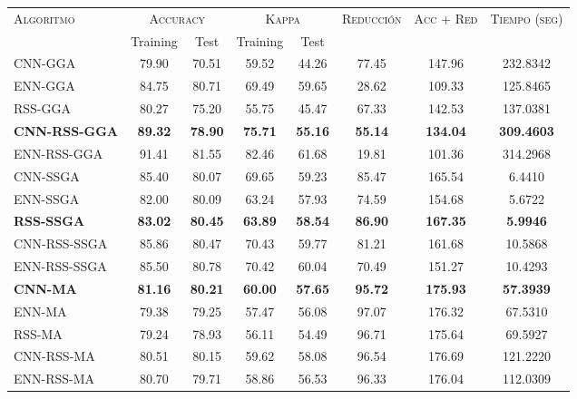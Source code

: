 \begin{table}[h!]
\centering
\begin{adjustbox}{max width =\textwidth}
\begin{tabular}{l c c c c c c c}
\hline
\multirow{2}{*}{\textsc{Algoritmo}}
	& \multicolumn{2}{c}{\textsc{Accuracy}}
	& \multicolumn{2}{c}{\textsc{Kappa}}
	& \textsc{Reducción}
	& \textsc{Acc + Red}
	& \textsc{Tiempo (seg)} \\
	& Training & Test
	& Training & Test \\ 
\hline
\hline

CNN-GGA     & 79.90 & 70.51 & 59.52 & 44.26 & 77.45 & 147.96 & 232.8342 \\
ENN-GGA     & 84.75 & 80.71 & 69.49 & 59.65 & 28.62 & 109.33 & 125.8465 \\
RSS-GGA     & 80.27 & 75.20 & 55.75 & 45.47 & 67.33 & 142.53 & 137.0381 \\
\textbf{CNN-RSS-GGA} & \textbf{89.32} & \textbf{78.90} & \textbf{75.71} & \textbf{55.16} & \textbf{55.14} & \textbf{134.04} & \textbf{309.4603} \\
ENN-RSS-GGA & 91.41 & 81.55 & 82.46 & 61.68 & 19.81 & 101.36 & 314.2968 \\

\hline

CNN-SSGA & 85.40 & 80.07 & 69.65 & 59.23 & 85.47 & 165.54 & 6.4410 \\
ENN-SSGA & 82.00 & 80.09 & 63.24 & 57.93 & 74.59 & 154.68 & 5.6722 \\
\textbf{RSS-SSGA} & \textbf{83.02} & \textbf{80.45} & \textbf{63.89} & \textbf{58.54} & \textbf{86.90} & \textbf{167.35} & \textbf{5.9946} \\
CNN-RSS-SSGA & 85.86 & 80.47 & 70.43 & 59.77 & 81.21 & 161.68 & 10.5868 \\
ENN-RSS-SSGA & 85.50 & 80.78 & 70.42 & 60.04 & 70.49 & 151.27 & 10.4293 \\

\hline

\textbf{CNN-MA} & \textbf{81.16} & \textbf{80.21} & \textbf{60.00} & \textbf{57.65} & \textbf{95.72} & \textbf{175.93} & \textbf{57.3939} \\
ENN-MA & 79.38 & 79.25 & 57.47 & 56.08 & 97.07 & 176.32 & 67.5310 \\
RSS-MA & 79.24 & 78.93 & 56.11 & 54.49 & 96.71 & 175.64 & 69.5927 \\
CNN-RSS-MA & 80.51 & 80.15 & 59.62 & 58.08 & 96.54 & 176.69 & 121.2220 \\
ENN-RSS-MA & 80.70 & 79.71 & 58.86 & 56.53 & 96.33 & 176.04 & 112.0309 \\


\end{tabular}
\end{adjustbox}
\end{table}
